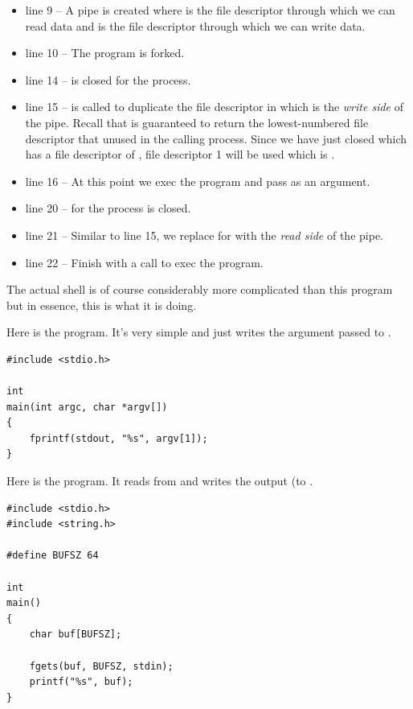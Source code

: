 \begin{itemize}
	\item line 9 -- A pipe is created where   is the file descriptor through which we can read data
		and  is the file descriptor through which we can write data.
	\item line 10 -- The program is forked.
	\item line 14 --  is closed for the  process.
	\item line 15 --  is called to duplicate the file descriptor in  which is the \textit{write side}
		of the pipe. Recall that  is guaranteed to return the lowest-numbered file descriptor that
		unused in the calling process. Since we have just closed  which has a file descriptor of ,
		 file descriptor 1 will be used which is .
	\item line 16 -- At this point we exec the  program and pass  as an argument.
	\item line 20 --  for the  process is closed.
	\item line 21 -- Similar to line 15, we replace  for  with the \textit{read side} of the pipe.
	\item line 22 -- Finish with a call to exec the  program.
\end{itemize}

\noindent
The actual shell is of course considerably more complicated than this program but in essence, this is what it is doing. 

Here is the  program. It's very simple and just writes the argument passed to .

\begin{lstlisting}
#include <stdio.h>

int
main(int argc, char *argv[])
{
    fprintf(stdout, "%s", argv[1]);
}
\end{lstlisting}

\noindent
Here is the  program. It reads from  and writes the output (to .

\begin{lstlisting}
#include <stdio.h>
#include <string.h>

#define BUFSZ 64

int
main()
{
    char buf[BUFSZ];

    fgets(buf, BUFSZ, stdin);
    printf("%s", buf);
}
\end{lstlisting}

